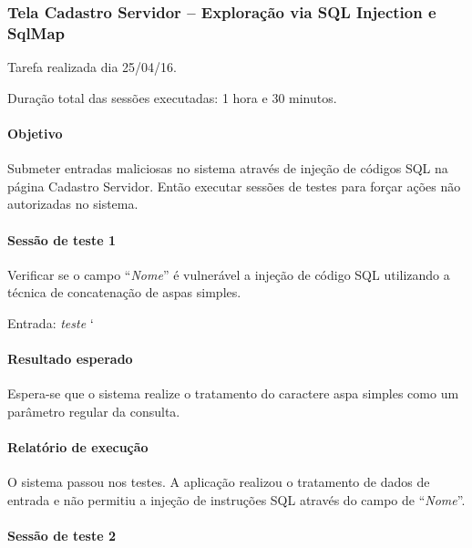 \documentclass[
    12pt,               %
    openright,          %
    oneside,            %
    a4paper,            %
    section=TITLE,     %
    english,            %
    french,             %
    spanish,            %
    brazil              %
    ]{abntex2}
\begin{document}
\subsubsection*{Tela Cadastro Servidor -- Exploração via SQL Injection e SqlMap}

Tarefa realizada dia 25/04/16.


Duração total das sessões executadas: 1 hora e 30 minutos.



\paragraph*{Objetivo}

Submeter entradas maliciosas no sistema através de injeção de códigos SQL na página Cadastro Servidor. Então executar sessões de testes para forçar ações não autorizadas no sistema.



\paragraph*{Sessão de teste 1}

Verificar se o campo \textquotedblleft{}\emph{Nome}\textquotedblright{} é vulnerável a injeção de código SQL utilizando a técnica de concatenação de aspas simples.


Entrada: \emph{teste $\lq$}



\paragraph*{Resultado esperado}

Espera-se que o sistema realize o tratamento do caractere aspa simples como um parâmetro regular da consulta.



\paragraph*{Relatório de execução}

O sistema passou nos testes. A aplicação realizou o tratamento de dados de entrada e não permitiu a injeção de instruções SQL através do campo de \textquotedblleft{}\emph{Nome}\textquotedblright{}.



\paragraph*{Sessão de teste 2}
\end{document}
